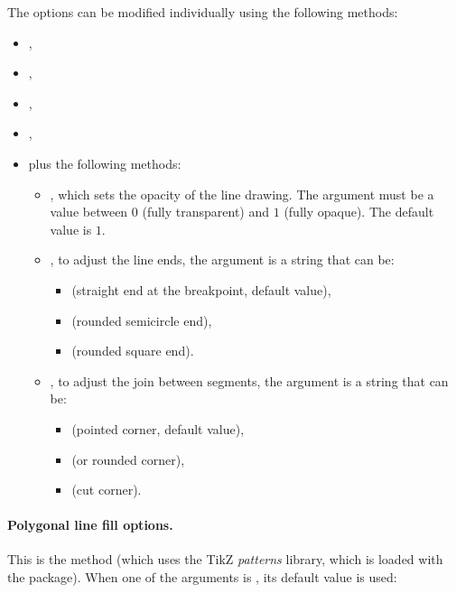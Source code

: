 The options can be modified individually using the following methods:
\begin{itemize}
    \item {},
    \item {},
    \item {},
    \item {},
    \item plus the following methods:
\begin{itemize}
    \item {}, which sets the opacity of the line drawing. The  argument must be a value between $0$ (fully transparent) and $1$ (fully opaque). The default value is $1$.     
    \item {}, to adjust the line ends, the  argument is a string that can be:
\begin{itemize}
    \item {} (straight end at the breakpoint, default value),
    \item {} (rounded semicircle end),
    \item {} (rounded square end).
\end{itemize}

    \item {}, to adjust the join between segments, the  argument is a string that can be:
\begin{itemize}
    \item {} (pointed corner, default value),
    \item {} (or rounded corner),
    \item {} (cut corner).
\end{itemize} 
\end{itemize}
\end{itemize}

\paragraph{Polygonal line fill options.}

This is the  method (which uses the TikZ \emph{patterns} library, which is loaded with the package). When one of the arguments is \nil, its default value is used:

